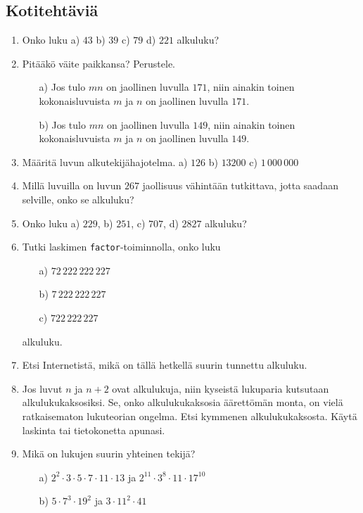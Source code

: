 \subsection*{Kotitehtäviä}

\begin{enumerate}

\item Onko luku a) $43$ b) $39$ c) $79$ d) $221$ alkuluku?

\item Pitääkö väite paikkansa? Perustele.
\begin{itemize}
\item[a)] Jos tulo $mn$ on jaollinen luvulla $171$, niin ainakin
toinen kokonaisluvuista $m$ ja $n$ on jaollinen luvulla $171$.

\item[b)] Jos tulo $mn$ on jaollinen luvulla $149$, niin ainakin
toinen kokonaisluvuista $m$ ja $n$ on jaollinen luvulla $149$.
\end{itemize}

\item Määritä luvun alkutekijähajotelma. a) $126$ b) $13200$ c)
$1\, 000\, 000$

\item Millä luvuilla on luvun $267$ jaollisuus vähintään
tutkittava, jotta saadaan selville, onko se alkuluku?

\item Onko luku a) $229$, b) $251$, c) $707$, d) $2827$ alkuluku?

\item Tutki laskimen {\tt factor}-toiminnolla, onko luku
\begin{itemize}
\item[a)] $72\,222\,222\,227$
\item[b)] $7\,222\,222\,227$
\item[c)] $722\,222\,227$
\end{itemize}
alkuluku.

\item Etsi Internetistä, mikä on tällä hetkellä suurin tunnettu
alkuluku.

\item
Jos luvut $n$ ja $n + 2$ ovat alkulukuja, niin kyseistä lukuparia
kutsutaan alkulukukaksosiksi. Se, onko alkulukukaksosia
äärettömän monta, on vielä ratkaisematon lukuteorian ongelma.
Etsi kymmenen alkulukukaksosta. Käytä laskinta tai tietokonetta
apunasi.

\item Mikä on lukujen suurin yhteinen tekijä?
\begin{itemize}
\item[a)] $2^2 \cdot 3 \cdot 5 \cdot 7 \cdot 11 \cdot 13$ ja
$2^{11} \cdot 3^8 \cdot 11 \cdot 17^{10}$
\item[b)] $5 \cdot 7^3 \cdot 19^2$ ja $3 \cdot 11^2 \cdot 41$
\end{itemize}


\end{enumerate}
